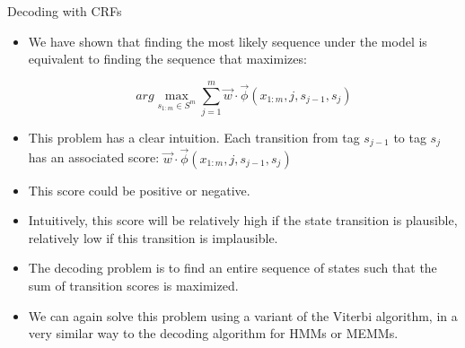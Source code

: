 \documentclass[handout]{beamer}
\begin{document}
\begin{frame}{Decoding with CRFs}
\begin{scriptsize}

\begin{itemize}
\item We have shown that finding the most likely sequence under the model is equivalent to finding the sequence that maximizes:

\begin{displaymath}
 arg \max_{s_{1:m} \in S^m}  \sum_{j=1}^{m} \vec{w} \cdot \vec{\phi}(x_{1:m},j,s_{j-1},s_j)  
\end{displaymath}

\item This problem has a clear intuition. Each transition from tag  $s_{j-1}$ to tag $s_j$ has an associated score:  $\vec{w} \cdot \vec{\phi}(x_{1:m},j,s_{j-1},s_j)$  


\item This score could be positive or negative. 

\item Intuitively, this score will be relatively high if the state transition is plausible, relatively low if this transition is implausible.

\item  The decoding problem is to find an entire sequence of states such that the sum of transition scores is maximized.

\item We can again solve this problem using a variant of the Viterbi algorithm, in a very similar way to the decoding algorithm for HMMs or MEMMs.

\end{itemize}


\end{scriptsize}
\end{frame}
\end{document}
